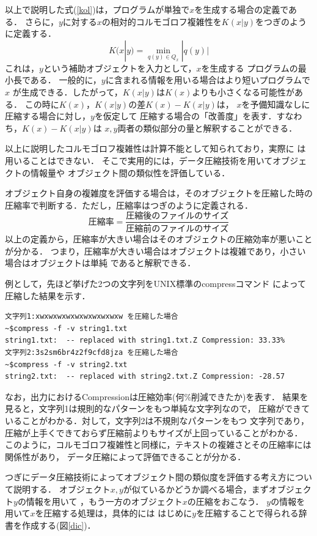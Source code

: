 以上で説明した式(\ref{kol})は，プログラムが単独で$x$を生成する場合の定義である．
さらに，$y$に対する$x$の相対的コルモゴロフ複雑性を$K(x|y)$をつぎのように定義する．
\begin{equation}
K(x|y) = \min_{q(y) \in Q_x} |q(y)| \label{kol2}
\end{equation}
これは，$y$という補助オブジェクトを入力として，$x$を生成する
プログラムの最小長である．
一般的に，$y$に含まれる情報を用いる場合はより短いプログラムで$x$
が生成できる．したがって，$K(x|y)$は$K(x)$よりも小さくなる可能性がある．
この時に$K(x)$，$K(x|y)$の差$K(x)-K(x|y)$は，
$x$を予備知識なしに圧縮する場合に対し，$y$を仮定して
圧縮する場合の「改善度」を表す．すなわち，$K(x)-K(x|y)$は
$x,y$両者の類似部分の量と解釈することができる．

以上に説明したコルモゴロフ複雑性は計算不能として知られており，実際に
は用いることはできない．
そこで実用的には，データ圧縮技術を用いてオブジェクトの情報量や
オブジェクト間の類似性を評価している．

オブジェクト自身の複雑度を評価する場合は，そのオブジェクトを圧縮した時の
圧縮率で判断する．ただし，圧縮率はつぎのように定義される．
\begin{equation}
圧縮率 = \frac{圧縮後のファイルのサイズ}{圧縮前のファイルのサイズ}
\end{equation}
以上の定義から，圧縮率が大きい場合はそのオブジェクトの圧縮効率が悪いことが分かる．
つまり，圧縮率が大きい場合はオブジェクトは複雑であり，小さい場合はオブジェクトは単純
であると解釈できる．

例として，先ほど挙げた2つの文字列をUNIX標準のcompressコマンド
によって圧縮した結果を示す．

\begin{verbatim}
文字列1:xwxwxwxwxwxwxwxwxwxw を圧縮した場合
~$compress -f -v string1.txt
string1.txt:  -- replaced with string1.txt.Z Compression: 33.33%
文字列2:3s2sm6br4z2f9cfd8jza を圧縮した場合
~$compress -f -v string2.txt
string2.txt:  -- replaced with string2.txt.Z Compression: -28.57
\end{verbatim}
なお，出力におけるCompressionは圧縮効率(何\%削減できたか)を表す．
結果を見ると，文字列1は規則的なパターンをもつ単純な文字列なので，
圧縮ができていることがわかる．対して，文字列2は不規則なパターンをもつ
文字列であり，圧縮が上手くできておらず圧縮前よりもサイズが上回っていることがわかる．
このように，コルモゴロフ複雑性と同様に，テキストの複雑さとその圧縮率には関係性があり，
データ圧縮によって評価できることが分かる．

つぎにデータ圧縮技術によってオブジェクト間の類似度を評価する考え方について説明する．
オブジェクト$x,y$が似ているかどうか調べる場合，まずオブジェクト$y$の情報を用いて
，もう一方のオブジェクト$x$の圧縮をおこなう．
$y$の情報を用いて$x$を圧縮する処理は，具体的には
はじめに$y$を圧縮することで得られる辞書を作成する(図\ref{dic})．

